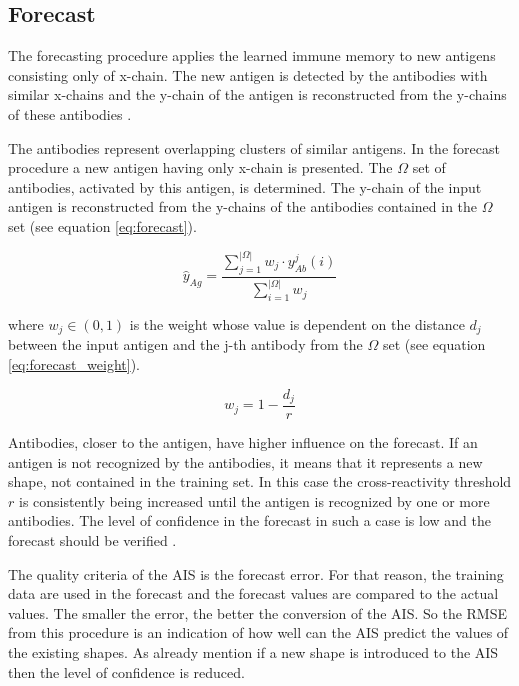 \documentclass{assignment}
\begin{document}
\begin{description}
\begin{description}
\end{description}

\end{description}

\subsection{Forecast}

The forecasting procedure applies the learned immune memory to new antigens consisting only of x-chain. The new antigen is detected by the antibodies with similar x-chains and the y-chain of the antigen is reconstructed from the y-chains of these antibodies \cite{AIS_STLF08}.

The antibodies represent overlapping clusters of similar antigens. In the forecast procedure a new antigen having only x-chain is presented. The $\Omega$ set of antibodies, activated by this antigen, is determined. The y-chain of the input antigen is reconstructed from the y-chains of the antibodies contained in the $\Omega$ set (see equation \eqref{eq:forecast}).

\begin{equation}
\hat{y}_{Ag} = \frac{\displaystyle\sum_{j=1}^{|\Omega|} w_j \cdot y_{Ab}^j(i) }{\displaystyle\sum_{i=1}^{|\Omega|}w_j}
\label{eq:forecast}
\end{equation}


where $w_j \in (0, 1)$ is the weight whose value is dependent on the distance $d_j$ between the input antigen and the j-th antibody from the $\Omega$ set (see equation \eqref{eq:forecast_weight}).

\begin{equation}
w_j = 1 - \frac{d_j}{r}
\label{eq:forecast_weight}
\end{equation}


Antibodies, closer to the antigen, have higher influence on the forecast. If an antigen is not recognized by the antibodies, it means that it represents a new shape, not contained in the training set. In this case the cross-reactivity threshold $r$ is consistently being increased until the antigen is recognized by one or more antibodies. The level of confidence in the forecast in such a case is low and the forecast should be verified \cite{AIS_STLF08}.

The quality criteria of the AIS is the forecast error. For that reason, the training data are used in the forecast and the forecast values are compared to the actual values. The smaller the error, the better the conversion of the AIS. So the RMSE from this procedure is an indication of how well can the AIS predict the values of the existing shapes. As already mention if a new shape is introduced to the AIS then the level of confidence is reduced.
\end{document}
